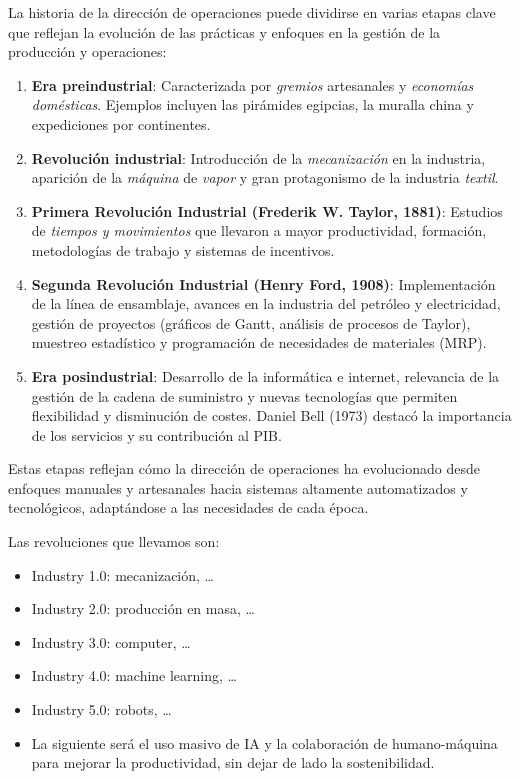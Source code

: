 \documentclass[12pt]{book} %
\providecommand{\tightlist}{%
  \setlength{\itemsep}{0pt}\setlength{\parskip}{0pt}}
\begin{document}
La historia de la dirección de operaciones puede dividirse en varias
etapas clave que reflejan la evolución de las prácticas y enfoques en la
gestión de la producción y operaciones:

\begin{enumerate}
\def\labelenumi{\arabic{enumi}.}
\item
  \textbf{Era preindustrial}: Caracterizada por \emph{gremios}
  artesanales y \emph{economías} \emph{domésticas}. Ejemplos incluyen
  las pirámides egipcias, la muralla china y expediciones por
  continentes.
\item
  \textbf{Revolución industrial}: Introducción de la \emph{mecanización}
  en la industria, aparición de la \emph{máquina} de \emph{vapor} y gran
  protagonismo de la industria \emph{textil}.
\item
  \textbf{Primera Revolución Industrial (Frederik W. Taylor, 1881)}:
  Estudios de \emph{tiempos y movimientos} que llevaron a mayor
  productividad, formación, metodologías de trabajo y sistemas de
  incentivos.
\item
  \textbf{Segunda Revolución Industrial (Henry Ford, 1908)}:
  Implementación de la línea de ensamblaje, avances en la industria del
  petróleo y electricidad, gestión de proyectos (gráficos de Gantt,
  análisis de procesos de Taylor), muestreo estadístico y programación
  de necesidades de materiales (MRP).
\item
  \textbf{Era posindustrial}: Desarrollo de la informática e internet,
  relevancia de la gestión de la cadena de suministro y nuevas
  tecnologías que permiten flexibilidad y disminución de costes. Daniel
  Bell (1973) destacó la importancia de los servicios y su contribución
  al PIB.
\end{enumerate}

Estas etapas reflejan cómo la dirección de operaciones ha evolucionado
desde enfoques manuales y artesanales hacia sistemas altamente
automatizados y tecnológicos, adaptándose a las necesidades de cada
época.

Las revoluciones que llevamos son:

\begin{itemize}
\tightlist
\item
  Industry 1.0: mecanización, \ldots{}\\
\item
  Industry 2.0: producción en masa, \ldots{}\\
\item
  Industry 3.0: computer, \ldots{}\\
\item
  Industry 4.0: machine learning, \ldots{}\\
\item
  Industry 5.0: robots, \ldots{}\\
\item
  La siguiente será el uso masivo de IA y la colaboración de
  humano-máquina para mejorar la productividad, sin dejar de lado la
  sostenibilidad.
\end{itemize}
\end{document}
